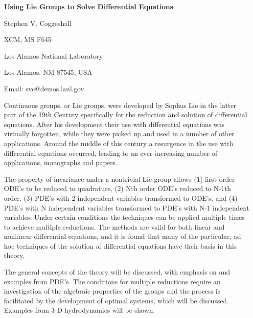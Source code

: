 

\centerline{\bf Using Lie Groups to Solve Differential Equations}

\vskip 0.3cm

\centerline{Stephen V. Coggeshall}
\centerline{XCM, MS F645}
\centerline{Los Alamos National Laboratory}
\centerline{Los Alamos, NM 87545, USA}
\centerline{Email: svc@demos.lanl.gov}

\vskip 0.3cm

Continuous groups, or Lie groups, were developed by Sophus Lie in the latter
part of the 19th Century specifically for the reduction and solution of
differential equations. After his development their use with differential
equations was virtually forgotten, while they were picked up and used in a
number of other applications. Around the middle of this century a resurgence
in the use with differential equations occurred, leading to an
ever-increasing number of applications, monographs and papers.

The property of invariance under a nontrivial Lie group allows (1) first
order ODE's to be reduced to quadrature, (2) Nth order ODE's reduced to
N-1th order, (3) PDE's with 2 independent variables transformed to ODE's,
and (4) PDE's with N independent variables transformed to PDE's with N-1
independent variables. Under certain conditions the techniques can be
applied multiple times to achieve multiple reductions. The methods are valid
for both linear and nonlinear differential equations, and it is found that
many of the particular, ad hoc techniques of the solution of differential
equations have their basis in this theory.

The general concepts of the theory will be discussed, with emphasis on and
examples from PDE's. The conditions for multiple reductions require an
investigation of the algebraic properties of the groups and the process is
facilitated by the development of optimal systems, which will be discussed.
Examples from 3-D hydrodynamics will be shown.


